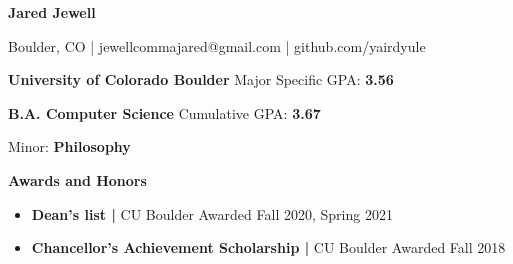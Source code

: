 \documentclass[12pt]{article}
\begin{document}
\thispagestyle{empty}
    
\begin{center}
  {\Large \textbf{Jared Jewell}}

  \vspace{1mm}

  Boulder, CO | jewellcommajared@gmail.com | github.com/yairdyule 

\end{center}

% 
% 
% 
% 

\vspace{-6mm}

\begin{flushleft}
  \hrulefill {} \quad \hrulefill

  \vspace{1mm}

  {\textbf{University of Colorado Boulder} }\hfill { \quad Major Specific GPA: \textbf{3.56}}
  \vspace{.5mm}

  {\quad \textbf{B.A. Computer Science}} \hfill {Cumulative GPA: \textbf{3.67}}

  {\quad \hspace{3mm} Minor: \textbf{Philosophy}} 

  {\vspace{2mm}}

  {\quad \textbf{Awards and Honors}}

  {\vspace{-4.3mm}}

  \begin{itemize} \setlength\itemsep{-0.3em}
    \item {\textbf{Dean's list  | }CU Boulder} 
      \hfill Awarded Fall 2020, Spring 2021
    \item {\textbf{Chancellor's Achievement Scholarship  | }CU Boulder} 
      \hfill Awarded Fall 2018
  \end{itemize}

\end{flushleft}
\end{document}
